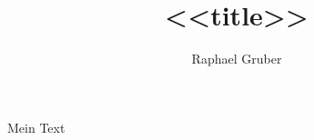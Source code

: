 \documentclass[11pt, a4paper, ngerman]{article}
\title{<<title>>}
\author{Raphael Gruber}
\begin{document}
	
	\maketitle
	
	Mein Text
\end{document}

